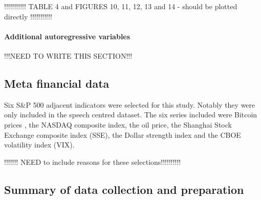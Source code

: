 \documentclass[11pt,preprint, authoryear]{elsarticle}
\numberwithin{equation}{section}
\numberwithin{figure}{section}
\numberwithin{table}{section}
\begin{document}
!!!!!!!!!!! TABLE 4 and FIGURES 10, 11, 12, 13 and 14 - should be
plotted directly !!!!!!!!!!!

\hypertarget{additional-autoregressive-variables}{%
\paragraph{Additional autoregressive
variables}\label{additional-autoregressive-variables}}

!!!NEED TO WRITE THIS SECTION!!!

\hypertarget{meta-financial-data}{%
\subsection{Meta financial data}\label{meta-financial-data}}

Six S\&P 500 adjacent indicators were selected for this study. Notably
they were only included in the speech centred dataset. The six series
included were Bitcoin prices , the NASDAQ composite index, the oil
price, the Shanghai Stock Exchange composite index (SSE), the Dollar
strength index and the CBOE volatility index (VIX).

!!!!!!! NEED to include reasons for these selections!!!!!!!!!!

\hypertarget{summary-of-data-collection-and-preparation}{%
\subsection{Summary of data collection and
preparation}\label{summary-of-data-collection-and-preparation}}
\end{document}

